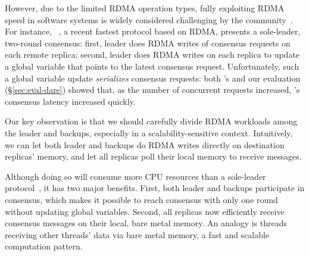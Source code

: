 However, due to the limited RDMA operation types, fully exploiting RDMA
speed in software systems is widely considered 
challenging by the community~\cite{pilaf:usenix14,herd:sigcomm14,
farm:sosp15,dare:hpdc15}. For instance, \dare~\cite{dare:hpdc15}, a recent 
fastest \paxos protocol based on RDMA, presents a sole-leader, two-round 
consensus: first, leader does RDMA writes of consensus requests on each remote 
replica; second, leader does RDMA writes on each replica to update a global 
variable that points to the latest consensus request. Unfortunately, such a 
global variable update \emph{serializes} consensus requests: both \dare's and 
our evaluation (\S\ref{sec:eval-dare}) showed that, as the number of concurrent 
requests increased, \dare's consensus latency increased quickly.




Our key observation is that we should carefully divide RDMA workloads among
the leader and backups, especially in a scalability-sensitive context. 
Intuitively, we can let both leader and backups do RDMA writes directly on 
destination replicas' memory, and let all replicas poll their local memory to 
receive messages.

Although doing so will consume more CPU resources than a sole-leader 
protocol~\cite{dare:hpdc15}, it has two major benefits. First, both leader and 
backups participate in consensus, which makes it possible to reach consensus 
with only one round~\cite{paxos:practical} without updating global variables. 
Second, all replicas now efficiently receive consensus messages on their local, 
bare metal memory. An analogy is threads receiving other threads' data via bare 
metal memory, a fast and scalable computation pattern.



